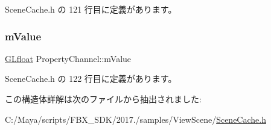  Scene\+Cache.\+h の 121 行目に定義があります。

\mbox{\label{struct_property_channel_af0146f683c4f9246f0ca414aeb7e8ce3}} 
\subsubsection{\texorpdfstring{m\+Value}{mValue}}
{\footnotesize\ttfamily \hyperlink{glew_8h_a31aeedaeef29442c9c015ab355c8f5ab}{G\+Lfloat} Property\+Channel\+::m\+Value}



 Scene\+Cache.\+h の 122 行目に定義があります。



この構造体詳解は次のファイルから抽出されました\+:\begin{DoxyCompactItemize}
\item 
C\+:/\+Maya/scripts/\+F\+B\+X\+\_\+\+S\+D\+K/2017./samples/\+View\+Scene/\hyperlink{_scene_cache_8h}{Scene\+Cache.\+h}\end{DoxyCompactItemize}
